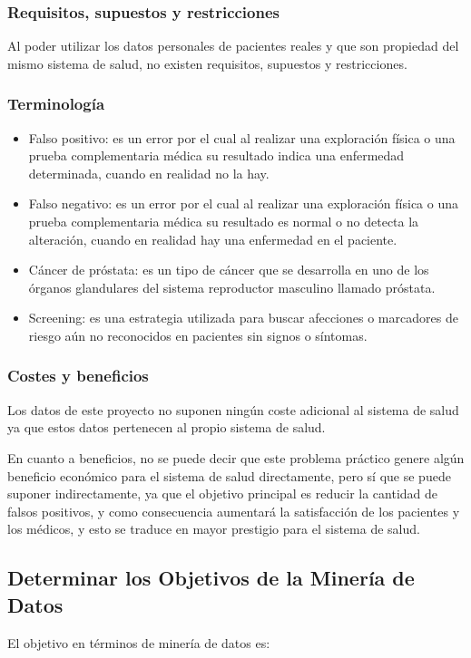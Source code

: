 \documentclass{article}
\begin{document}
\subsubsection{Requisitos, supuestos y restricciones}
Al poder utilizar los datos personales de pacientes reales y que son propiedad del mismo sistema de salud, no existen requisitos, supuestos y restricciones.

\subsubsection{Terminología}

\begin{itemize}
	\item Falso positivo: es un error por el cual al realizar una exploración física o una prueba complementaria médica su resultado indica una enfermedad determinada, cuando en realidad no la hay.
	\item Falso negativo: es un error por el cual al realizar una exploración física o una prueba complementaria médica su resultado es normal o no detecta la alteración, cuando en realidad hay una enfermedad en el paciente.
	\item Cáncer de próstata: es un tipo de cáncer que se desarrolla en uno de los órganos glandulares del sistema reproductor masculino llamado próstata.
	\item Screening: es una estrategia utilizada para buscar afecciones o marcadores de riesgo aún no reconocidos en pacientes sin signos o síntomas.
\end{itemize}

\subsubsection{Costes y beneficios}
Los datos de este proyecto no suponen ningún coste adicional al sistema de salud ya que estos datos pertenecen al propio sistema de salud.

En cuanto a beneficios, no se puede decir que este problema práctico genere algún beneficio económico para el sistema de salud directamente, pero sí que se puede suponer indirectamente, ya que el objetivo principal es reducir la cantidad de falsos positivos, y como consecuencia aumentará la satisfacción de los pacientes y los médicos, y esto se traduce en mayor prestigio para el sistema de salud.

\subsection{Determinar los Objetivos de la Minería de Datos}\label{Objetivos de la Minería de Datos}
El objetivo en términos de minería de datos es:
\end{document}
